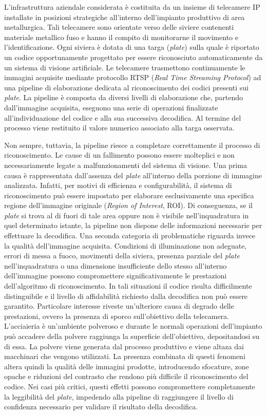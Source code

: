 \documentclass[
    target=bach,
    aauheader=,
    style=
]{thud}
\begin{document}
L'infrastruttura aziendale considerata è costituita da un insieme di telecamere IP installate in posizioni strategiche all'interno dell'impianto produttivo di area metallurgica. Tali telecamere sono orientate verso delle siviere contenenti materiale metallico fuso e hanno il compito di monitorarne il movimento e l'identificazione. Ogni siviera è dotata di una targa (\textit{plate}) sulla quale è riportato un codice opportunamente progettato per essere riconosciuto automaticamente da un sistema di visione artificiale. Le telecamere trasmettono continuamente le immagini acquisite mediante protocollo RTSP (\textit{Real Time Streaming Protocol}) ad una pipeline di elaborazione dedicata al riconoscimento dei codici presenti sui \textit{plate}. La pipeline è composta da diversi livelli di elaborazione che, partendo dall'immagine acquisita, eseguono una serie di operazioni finalizzate all'individuazione del codice e alla sua successiva decodifica. Al termine del processo viene restituito il valore numerico associato alla targa osservata.

Non sempre, tuttavia, la pipeline riesce a completare correttamente il processo di riconoscimento. Le cause di un fallimento possono essere molteplici e non necessariamente legate a malfunzionamenti del sistema di visione. Una prima causa è rappresentata dall'assenza del \textit{plate} all'interno della porzione di immagine analizzata. Infatti, per motivi di efficienza e configurabilità, il sistema di riconoscimento può essere impostato per elaborare esclusivamente una specifica regione dell'immagine originale (\textit{Region of Interest}, ROI). Di conseguenza, se il \textit{plate} si trova al di fuori di tale area oppure non è visibile nell'inquadratura in quel determinato istante, la pipeline non dispone delle informazioni necessarie per effettuare la decodifica. Una seconda categoria di problematiche riguarda invece la qualità dell'immagine acquisita. Condizioni di illuminazione non adeguate, errori di messa a fuoco, movimenti della siviera, presenza parziale del \textit{plate} nell'inquadratura o una dimensione insufficiente dello stesso all'interno dell'immagine possono compromettere significativamente le prestazioni dell'algoritmo di riconoscimento. In tali situazioni il codice risulta difficilmente distinguibile e il livello di affidabilità richiesto dalla decodifica non può essere garantito. Particolare interesse riveste un'ulteriore causa di degrado delle prestazioni, ovvero la presenza di sporco sull'obiettivo della telecamera. L'acciaieria è un'ambiente polveroso e durante le normali operazioni dell'impianto può accadere della polvere raggiunga la superficie dell'obiettivo, depositandosi su di essa. La polvere viene generata dal processo produttivo e viene altaza dai macchinari che vengono utilizzati.
La presenza combinata di questi fenomeni altera quindi la qualità delle immagini prodotte, introducendo sfocature, zone opache e riduzioni del contrasto che rendono più difficile il riconoscimento del codice. Nei casi più critici, questi effetti possono compromettere completamente la leggibilità del \textit{plate}, impedendo alla pipeline di raggiungere il livello di confidenza necessario per validare il risultato della decodifica.
\end{document}
